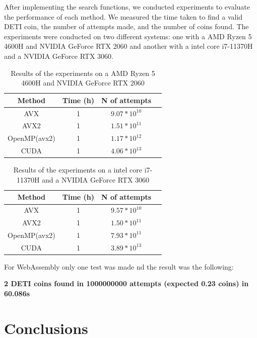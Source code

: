 \documentclass[a4paper,12pt]{article}
\begin{document}
After implementing the search functions, we conducted experiments to evaluate the performance
of each method. We measured the time taken to find a valid DETI coin, the number of attempts
made, and the number of coins found. The experiments were conducted on two different systems:
one with a AMD Ryzen 5 4600H and NVIDIA GeForce RTX 2060 and another with a intel core i7-11370H and a NVIDIA GeForce RTX 
3060.

\begin{table}[H]
    \centering
    \begin{tabular}{|c|c|c|c|}
        \hline
        \textbf{Method} & \textbf{Time (h)} & \textbf{N of attempts}\\
        \hline
        AVX & 1 & $9.07*10^{10}$   \\
        AVX2 & 1 & $1.51*10^{11}$ \\
        OpenMP(avx2) & 1 & $1.17*10^{12}$ \\
        CUDA & 1 & $4.06*10^{13}$   \\
        \hline
    \end{tabular}
    \caption{Results of the experiments on a AMD Ryzen 5 4600H and NVIDIA GeForce RTX 2060}
    \label{tab:results1}
\end{table}

\begin{table}[H]
    \centering
    \begin{tabular}{|c|c|c|c|}
        \hline
        \textbf{Method} & \textbf{Time (h)} & \textbf{N of attempts}  \\
        \hline
        AVX & 1 & $9.57*10^{10}$   \\
        AVX2 & 1 &  $1.50*10^{11}$ \\
        OpenMP(avx2) & 1 & $7.93*10^{11}$  \\
        CUDA & 1 & $3.89*10^{13}$  \\
        \hline
    \end{tabular}
    \caption{Results of the experiments on a intel core i7-11370H and a NVIDIA GeForce RTX 3060}
    \label{tab:results2}
\end{table}

For WebAssembly only one test was made nd the result was the following:

\textbf{2 DETI coins found in 1000000000 attempts (expected 0.23 coins) in 60.086s}


\section{Conclusions}
\label{sec:discussion}
\end{document}
